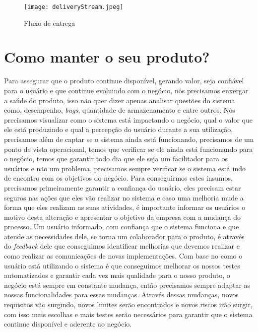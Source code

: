       \begin{figure}[!h]
        \centering
        \texttt{[image: deliveryStream.jpeg]}
        \caption{Fluxo de entrega}
        \label{Imagem:4}
      \end{figure}

  \chapter{Como manter o seu produto?}
    Para assegurar que o produto continue disponível, gerando valor, seja confiável
    para o usuário e que continue evoluindo com o negócio, nós precisamos enxergar
    a saúde do produto, isso não quer dizer apenas analisar questões do sistema
    como, desempenho, \textit{bugs}, quantidade de armazenamento e entre outros.
    Nós precisamos visualizar como o sistema está impactando o negócio, qual o
    valor que ele está produzindo e qual a percepção do usuário durante a sua
    utilização, precisamos além de captar se o sistema ainda está funcionando,
    precisamos de um ponto de vista operacional, temos que verificar se ele ainda
    está funcionando para o negócio, temos que garantir todo dia que ele seja um
    facilitador para os usuários e não um problema, precisamos sempre verificar
    se o sistema está indo de encontro com os objetivos do negócio. \newline
    Para conseguirmos estes insumos, precisamos primeiramente garantir a confiança
    do usuário, eles precisam estar seguros nas ações que eles vão realizar no
    sistema e caso uma melhoria mude a forma que eles realizam as suas atividades,
    é importante informar os usuários o motivo desta alteração e apresentar o
    objetivo da empresa com a mudança do processo. Um usuário informado, com
    confiança que o sistema funciona e que atende as necessidades dele, se torna
    um colaborador para o produto, é através do \textit{feedback} dele que conseguimos
    identificar melhorias que devemos realizar e como realizar as comunicações de
    novas implementações. Com base no como o usuário está utilizando o sistema
    é que conseguimos melhorar os nossos testes automatizados e garantir cada vez
    mais qualidade para o nosso produto, o negócio está sempre em constante
    mudança, então precisamos sempre adaptar as nossas funcionalidades para essas
    mudanças. Através dessas mudanças, novos requisitos vão surgindo, novos
    limites serão encontrados e novos riscos irão surgir, com isso mais escolhas
    e mais testes serão necessários para garantir que o sistema continue disponível
    e aderente ao negócio.

